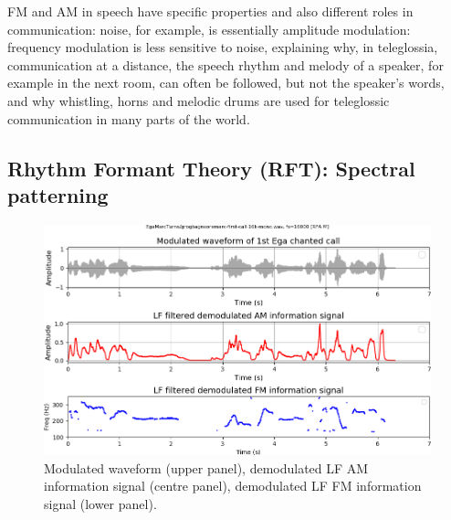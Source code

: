 \documentclass[output=paper,colorlinks,citecolor=brown]{langscibook}
\begin{document}
FM and AM in speech have specific properties and also different roles in communication: noise, for example, is essentially amplitude modulation: frequency modulation is less sensitive to noise, explaining why, in teleglossia, communication at a distance, the speech rhythm and melody of a speaker, for example in the next room, can often be followed, but not the speaker's words, and why whistling, horns and melodic drums are used for teleglossic communication in many parts of the world.

\subsection{Rhythm Formant Theory (RFT): Spectral patterning}

\begin{figure}
\includegraphics[width=\textwidth]{gibbon_figure05.png}
\caption{\label{fig:fig05}Modulated waveform (upper panel), demodulated LF AM information signal (centre panel), demodulated LF FM information signal (lower panel).}
\end{figure}
\end{document}
